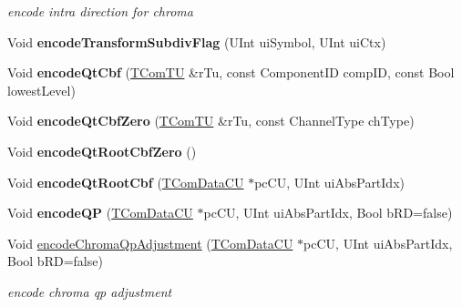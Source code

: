 \begin{DoxyCompactItemize}
\begin{DoxyCompactList}\small\item\em encode intra direction for chroma \end{DoxyCompactList}\item 
\mbox{\label{class_t_enc_entropy_a792bda960d5338c2301520ee26d3c573}} 
Void {\bfseries encode\+Transform\+Subdiv\+Flag} (U\+Int ui\+Symbol, U\+Int ui\+Ctx)
\item 
\mbox{\label{class_t_enc_entropy_a837735d44b6aecca7bf213d2ca57e943}} 
Void {\bfseries encode\+Qt\+Cbf} (\hyperlink{class_t_com_t_u}{T\+Com\+TU} \&r\+Tu, const Component\+ID comp\+ID, const Bool lowest\+Level)
\item 
\mbox{\label{class_t_enc_entropy_a298c83a242d31cd6fadc06c9d3f27101}} 
Void {\bfseries encode\+Qt\+Cbf\+Zero} (\hyperlink{class_t_com_t_u}{T\+Com\+TU} \&r\+Tu, const Channel\+Type ch\+Type)
\item 
\mbox{\label{class_t_enc_entropy_a03167d5faa5a44f4fe6234604b4ddfb4}} 
Void {\bfseries encode\+Qt\+Root\+Cbf\+Zero} ()
\item 
\mbox{\label{class_t_enc_entropy_aa453a2610efe945c92fe9e0a97fe00e8}} 
Void {\bfseries encode\+Qt\+Root\+Cbf} (\hyperlink{class_t_com_data_c_u}{T\+Com\+Data\+CU} $\ast$pc\+CU, U\+Int ui\+Abs\+Part\+Idx)
\item 
\mbox{\label{class_t_enc_entropy_a19137801f1ca8c131fafa63b8a1141c5}} 
Void {\bfseries encode\+QP} (\hyperlink{class_t_com_data_c_u}{T\+Com\+Data\+CU} $\ast$pc\+CU, U\+Int ui\+Abs\+Part\+Idx, Bool b\+RD=false)
\item 
\mbox{\label{class_t_enc_entropy_a7053d13e6984b82e1dea495bc014f686}} 
Void \hyperlink{class_t_enc_entropy_a7053d13e6984b82e1dea495bc014f686}{encode\+Chroma\+Qp\+Adjustment} (\hyperlink{class_t_com_data_c_u}{T\+Com\+Data\+CU} $\ast$pc\+CU, U\+Int ui\+Abs\+Part\+Idx, Bool b\+RD=false)
\begin{DoxyCompactList}\small\item\em encode chroma qp adjustment \end{DoxyCompactList}\item 

\end{DoxyCompactItemize}
